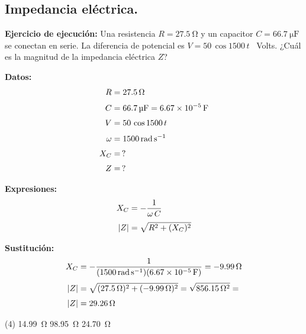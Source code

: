 \documentclass[12pt]{exam}
\begin{document}
\begin{questions}
    \newpage

    \setcounter{section}{14} 
    \section{Impedancia eléctrica.}

    \setcounter{question}{29} \question \textbf{Ejercicio de ejecución: } Una resistencia $R = \SI{27.5}{\ohm}$ y un capacitor $C = \SI{66.7}{\micro\farad}$ se conectan en serie. La diferencia de potencial es $V = \num{50} \, \cos 1500 \, t$ \, Volts. ¿Cuál es la magnitud de la impedancia eléctrica $Z$?
    
    \vspace*{0.3cm}
    \begin{minipage}[t]{0.35\linewidth}
    \textbf{Datos:}
    \begin{align*}
    R &= \SI{27.5}{\ohm} \\[0.3em]
    C &= \SI{66.7}{\micro\farad} = \SI{6.67d-5}{\farad} \\[0.3em]
    V &= \num{50} \, \cos 1500 \, t \\[0.3em]
    \omega &= \SI{1500}{\radian\per\second} \\[0.3em]
    X_{C} &= \, ? \\[0.3em]
    Z &= \, ? \\
    \end{align*}
    \end{minipage}
    \hspace{1cm}
    \begin{minipage}[t]{0.4\linewidth}
    \textbf{Expresiones:}
    \begin{align*}
    X_{C} &= - \dfrac{1}{\omega \, C} \\[0.3em]
    \abs{Z} &= \sqrt{R^{2} + (X_{C})^{2}}
    \end{align*}
    \end{minipage}
    
    \vspace*{0.3cm}
    \textbf{Sustitución:}
    \begin{align*}
    X_{C} &= - \dfrac{1}{(\SI{1500}{\radian\per\second})(\SI{6.67d-5}{\farad})} = -\SI{9.99}{\ohm} \\[0.3em]
    \abs{Z} &= \sqrt{(\SI{27.5}{\ohm})^{2} + (\SI{-9.99}{\ohm})^{2}} = \sqrt{\SI{856.15}{\square\ohm}} = \\[0.3em]
    \abs{Z} &= \SI{29.26}{\ohm}
    \end{align*}

    \vspace{0.3cm}
    \begin{tasks}(4)
        \task \SI{14.99}{\ohm}
        \task \SI{98.95}{\ohm}
        \task {}
        \task \SI{24.70}{\ohm}
    \end{tasks}

\end{questions}
\end{document}
